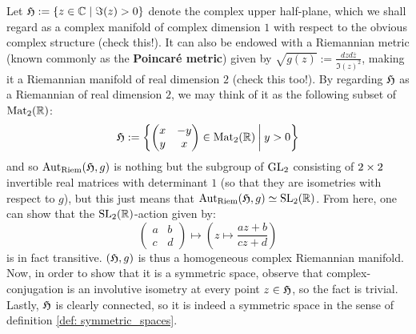            \begin{example} \label{example: upper_half_plane_is_a_symmetric_space}
                Let $\mathfrak{H} := \{z \in \mathbb{C} \mid \Im(z) > 0 \}$ denote the complex upper half-plane, which we shall regard as a complex manifold of complex dimension $1$ with respect to the obvious complex structure (check this!). It can also be endowed with a Riemannian metric (known commonly as the \textbf{Poincar\'e metric}) given by $\sqrt{g(z)} := \frac{dz d\overline{z}}{\Im(z)^2}$, making it a Riemannian manifold of real dimension $2$ (check this too!). By regarding $\mathfrak{H}$ as a Riemannian of real dimension $2$, we may think of it as the following subset of $\mathrm{Mat}_2(\mathbb{R})$:
                    $$
                        \mathfrak{H} :=
                        \left\{
                            \begin{pmatrix}
                                x & -y
                                \\
                                y & x
                            \end{pmatrix}
                            \in \mathrm{Mat}_2(\mathbb{R})
                            \:
                            \bigg|
                            \:
                            y > 0
                        \right\}
                    $$
                and so $\mathrm{Aut}_{\mathrm{Riem}}(\mathfrak{H}, g)$ is nothing but the subgroup of $\operatorname{GL}_2$ consisting of $2 \x 2$ invertible real matrices with determinant $1$ (so that they are isometries with respect to $g$), but this just means that $\mathrm{Aut}_{\mathrm{Riem}}(\mathfrak{H}, g) \simeq \operatorname{SL}_2(\mathbb{R})$. From here, one can show that the $\operatorname{SL}_2(\mathbb{R})$-action given by:
                    $$\begin{pmatrix}a & b\\c & d\end{pmatrix} \mapsto \left(z \mapsto \frac{az + b}{cz + d}\right)$$
                is in fact transitive. $(\mathfrak{H}, g)$ is thus a homogeneous complex Riemannian manifold. Now, in order to show that it is a symmetric space, observe that complex-conjugation is an involutive isometry at every point $z \in \mathfrak{H}$, so the fact is trivial. Lastly, $\mathfrak{H}$ is clearly connected, so it is indeed a symmetric space in the sense of definition \ref{def: symmetric_spaces}.
            \end{example}
            \begin{example} \label{example: complex_projective_line_is_a_symmetric_space}
                    
            \end{example}
